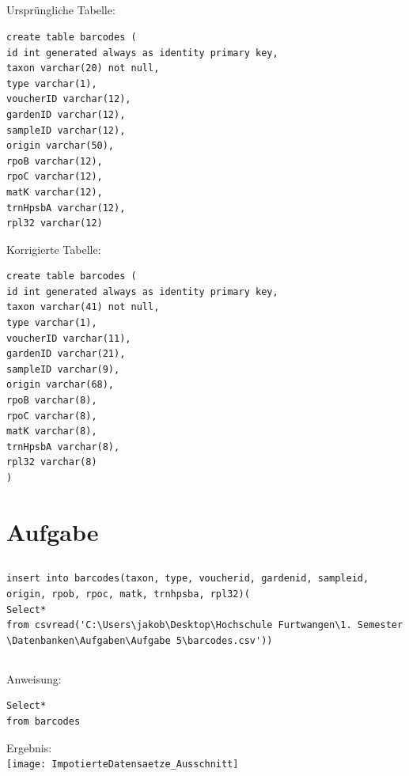 \documentclass[a4paper, 11pt, titlepage]{article}
\begin{document}
\subsection{}
Ursprüngliche Tabelle:
\begin{verbatim}
create table barcodes (
id int generated always as identity primary key,
taxon varchar(20) not null,
type varchar(1),
voucherID varchar(12),
gardenID varchar(12),
sampleID varchar(12),
origin varchar(50),
rpoB varchar(12),
rpoC varchar(12),
matK varchar(12),
trnHpsbA varchar(12),
rpl32 varchar(12)
\end{verbatim}
Korrigierte Tabelle:
\begin{verbatim}
create table barcodes (
id int generated always as identity primary key,
taxon varchar(41) not null,
type varchar(1),
voucherID varchar(11),
gardenID varchar(21),
sampleID varchar(9),
origin varchar(68),
rpoB varchar(8),
rpoC varchar(8),
matK varchar(8),
trnHpsbA varchar(8),
rpl32 varchar(8)
)
\end{verbatim}

\section{Aufgabe}
\subsection{}
\begin{verbatim}
insert into barcodes(taxon, type, voucherid, gardenid, sampleid, 
origin, rpob, rpoc, matk, trnhpsba, rpl32)(
Select*
from csvread('C:\Users\jakob\Desktop\Hochschule Furtwangen\1. Semester
\Datenbanken\Aufgaben\Aufgabe 5\barcodes.csv'))
\end{verbatim}
\subsection{}
Anweisung:
\begin{verbatim}
Select*
from barcodes
\end{verbatim}
Ergebnis:\\
\texttt{[image: ImpotierteDatensaetze\_Ausschnitt]}\\
\end{document}
